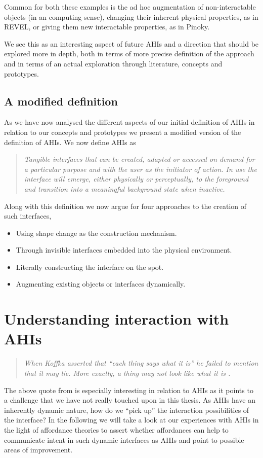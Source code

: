 Common for both these examples is the ad hoc augmentation of non-interactable objects (in an computing sense), changing their inherent physical properties, as in REVEL, or giving them new interactable properties, as in Pinoky.

We see this as an interesting aspect of future AHIs and a direction that should be explored more in depth, both in terms of more precise definition of the approach and in terms of an actual exploration through literature, concepts and prototypes.

\subsection{A modified definition}
As we have now analysed the different aspects of our initial definition of AHIs in relation to our concepts and prototypes we present a modified version of the definition of AHIs.
We now define AHIs as
\begin{quotation}
\emph{Tangible interfaces that can be created, adapted or accessed on demand for a particular purpose and with the user as the initiator of action. In use the interface will emerge, either physically or perceptually, to the foreground and transition into a meaningful background state when inactive.}
\end{quotation}

Along with this definition we now argue for four approaches to the creation of such interfaces,

\begin{itemize}
	\item{Using shape change as the construction mechanism.}
	\item{Through invisible interfaces embedded into the physical environment.}
	\item{Literally constructing the interface on the spot.}
	\item{Augmenting existing objects or interfaces dynamically.}
\end{itemize} 

\section{Understanding interaction with AHIs}
\begin{quotation}
\emph{When Koffka asserted that ``each thing says what it is'' he failed to mention that it may lie. More exactly, a thing may not look like what it is \citep{gibson1979ecological}.}
\end{quotation}
The above quote from \citeauthor{gibson1979ecological} is especially interesting in relation to AHIs as it points to a challenge that we have not really touched upon in this thesis.
As AHIs have an inherently dynamic nature, how do we ``pick up'' the interaction possibilities of the interface? 
In the following we will take a look at our experiences with AHIs in the light of affordance theories to assert whether affordances can help to communicate intent in such dynamic interfaces as AHIs and point to possible areas of improvement.

